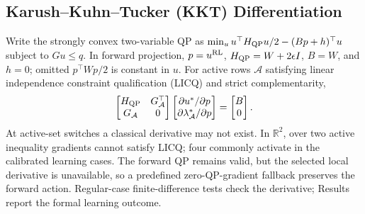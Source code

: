 \subsection{Karush--Kuhn--Tucker (KKT) Differentiation}
Write the strongly convex two-variable QP as $\min_u u^\top H_{\rm QP}u/2-(Bp+h)^\top u$ subject to $Gu\le q$. In forward projection, $p=u^{\rm RL}$, $H_{\rm QP}=W+2\epsilon I$, $B=W$, and $h=0$; omitted $p^\top Wp/2$ is constant in $u$. For active rows $\mathcal A$ satisfying linear independence constraint qualification (LICQ) and strict complementarity,
\begin{equation}\label{eq:kktdiff}
\begin{bmatrix}H_{\rm QP}&G_{\mathcal A}^\top\\G_{\mathcal A}&0\end{bmatrix}
\begin{bmatrix}\partial u^*/\partial p\\\partial\lambda_{\mathcal A}^*/\partial p\end{bmatrix}
=\begin{bmatrix}B\\0\end{bmatrix}.
\end{equation}
At active-set switches a classical derivative may not exist. In $\mathbb R^2$, over two active inequality gradients cannot satisfy LICQ; four commonly activate in the calibrated learning cases. The forward QP remains valid, but the selected local derivative is unavailable, so a predefined zero-QP-gradient fallback preserves the forward action. Regular-case finite-difference tests check the derivative; Results report the formal learning outcome.

